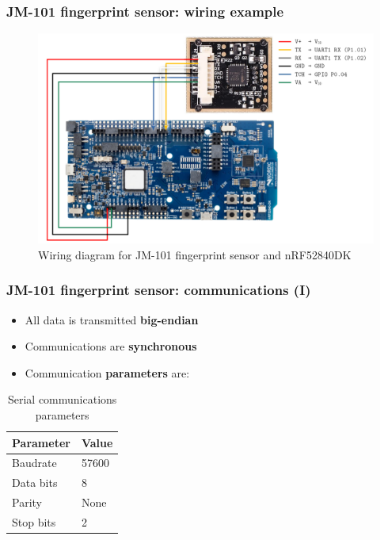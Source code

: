 \documentclass[handout]{beamer}
\begin{document}
\begin{frame}
  \frametitle{JM-101 fingerprint sensor: wiring example}

  \begin{figure}
    \centering
    \includegraphics[scale=0.25]{fingerprint-sensor-wiring.png}
    \caption{Wiring diagram for JM-101 fingerprint sensor and nRF52840DK}
  \end{figure}
\end{frame}

\begin{frame}
  \frametitle{JM-101 fingerprint sensor: communications (I)}

  \begin{itemize}
    \item All data is transmitted \textbf{big-endian}
    \item Communications are \textbf{synchronous}
    \item Communication \textbf{parameters} are:
  \end{itemize}

  \begin{table}
    \centering
    \begin{tabular}{ll}
      \toprule
      Parameter & Value \\
      \midrule
      Baudrate  & 57600 \\
      Data bits & 8     \\
      Parity    & None  \\
      Stop bits & 2     \\
      \bottomrule
    \end{tabular}
    \caption{Serial communications parameters}
  \end{table}
\end{frame}
\end{document}
